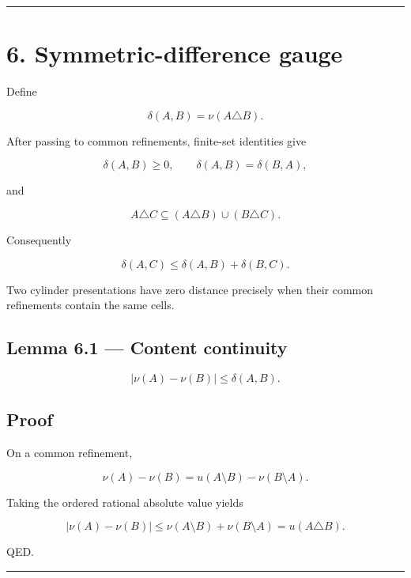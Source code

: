\begin{center}\rule{0.5\linewidth}{0.5pt}\end{center}

\hypertarget{symmetric-difference-gauge}{%
\section{6. Symmetric-difference gauge}\label{symmetric-difference-gauge}}

Define

\[
\boxed{
\delta(A,B)=\nu(A\triangle B).
}
\tag{6.1}
\]

After passing to common refinements, finite-set identities give

\[
\delta(A,B)\ge0,
\qquad
\delta(A,B)=\delta(B,A),
\tag{6.2}
\]

and

\[
A\triangle C
\subseteq
(A\triangle B)\cup(B\triangle C).
\tag{6.3}
\]

Consequently

\[
\boxed{
\delta(A,C)
\le
\delta(A,B)+\delta(B,C).
}
\tag{6.4}
\]

Two cylinder presentations have zero distance precisely when their common
refinements contain the same cells.

\hypertarget{lemma-6.1-content-continuity}{%
\subsection{Lemma 6.1 --- Content continuity}\label{lemma-6.1-content-continuity}}

\[
\boxed{
|\nu(A)-\nu(B)|\le\delta(A,B).
}
\tag{6.5}
\]

\hypertarget{proof-3}{%
\subsection{Proof}\label{proof-3}}

On a common refinement,

\[
\nu(A)-\nu(B)
=
u(A\setminus B)-\nu(B\setminus A).
\]

Taking the ordered rational absolute value yields

\[
|\nu(A)-\nu(B)|
\le
\nu(A\setminus B)+\nu(B\setminus A)
=
u(A\triangle B).
\]

QED.

\begin{center}\rule{0.5\linewidth}{0.5pt}\end{center}

